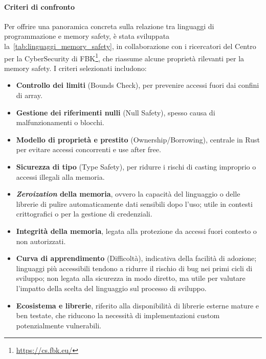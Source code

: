 \paragraph{Criteri di confronto}
Per offrire una panoramica concreta sulla relazione tra linguaggi di programmazione
e memory safety, è stata sviluppata la~\autoref{tab:linguaggi_memory_safety}, in
collaborazione con i ricercatori del Centro per la CyberSecurity di FBK\footnote{\url{https://cs.fbk.eu/}},
che riassume alcune proprietà rilevanti per la memory safety. I criteri
selezionati includono:
\begin{itemize}
  \item \textbf{Controllo dei limiti} (Bounds Check), per prevenire accessi fuori
    dai confini di array.

  \item \textbf{Gestione dei riferimenti nulli} (Null Safety), spesso causa di malfunzionamenti
    o blocchi.

  \item \textbf{Modello di proprietà e prestito} (Ownership/Borrowing), centrale
    in Rust per evitare accessi concorrenti e use after free.

  \item \textbf{Sicurezza di tipo} (Type Safety), per ridurre i rischi di casting
    improprio o accessi illegali alla memoria.

  \item \textbf{\textit{Zeroization} della memoria}, ovvero la capacità del linguaggio
    o delle librerie di pulire automaticamente dati sensibili dopo l'uso; utile
    in contesti crittografici o per la gestione di credenziali.

  \item \textbf{Integrità della memoria}, legata alla protezione da accessi fuori
    contesto o non autorizzati.

  \item \textbf{Curva di apprendimento} (Difficoltà), indicativa della facilità di
    adozione; linguaggi più accessibili tendono a ridurre il rischio di bug nei
    primi cicli di sviluppo; non legata alla sicurezza in modo diretto, ma utile
    per valutare l'impatto della scelta del linguaggio sul processo di sviluppo.

  \item \textbf{Ecosistema e librerie}, riferito alla disponibilità di librerie esterne
    mature e ben testate, che riducono la necessità di implementazioni custom
    potenzialmente vulnerabili.
\end{itemize}

